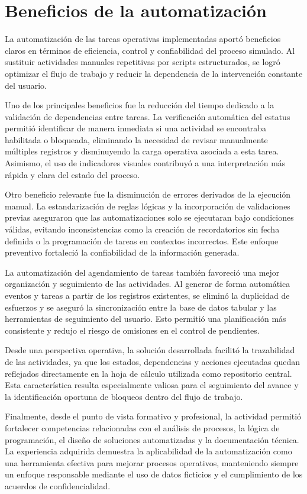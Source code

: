 \documentclass[12pt]{article}
\begin{document}
\section*{Beneficios de la automatización}

La automatización de las tareas operativas implementadas aportó beneficios claros en términos de eficiencia, control y confiabilidad del proceso simulado. Al sustituir actividades manuales repetitivas por scripts estructurados, se logró optimizar el flujo de trabajo y reducir la dependencia de la intervención constante del usuario.

Uno de los principales beneficios fue la reducción del tiempo dedicado a la validación de dependencias entre tareas. La verificación automática del estatus permitió identificar de manera inmediata si una actividad se encontraba habilitada o bloqueada, eliminando la necesidad de revisar manualmente múltiples registros y disminuyendo la carga operativa asociada a esta tarea. Asimismo, el uso de indicadores visuales contribuyó a una interpretación más rápida y clara del estado del proceso.

Otro beneficio relevante fue la disminución de errores derivados de la ejecución manual. La estandarización de reglas lógicas y la incorporación de validaciones previas aseguraron que las automatizaciones solo se ejecutaran bajo condiciones válidas, evitando inconsistencias como la creación de recordatorios sin fecha definida o la programación de tareas en contextos incorrectos. Este enfoque preventivo fortaleció la confiabilidad de la información generada.

La automatización del agendamiento de tareas también favoreció una mejor organización y seguimiento de las actividades. Al generar de forma automática eventos y tareas a partir de los registros existentes, se eliminó la duplicidad de esfuerzos y se aseguró la sincronización entre la base de datos tabular y las herramientas de seguimiento del usuario. Esto permitió una planificación más consistente y redujo el riesgo de omisiones en el control de pendientes.

Desde una perspectiva operativa, la solución desarrollada facilitó la trazabilidad de las actividades, ya que los estados, dependencias y acciones ejecutadas quedan reflejados directamente en la hoja de cálculo utilizada como repositorio central. Esta característica resulta especialmente valiosa para el seguimiento del avance y la identificación oportuna de bloqueos dentro del flujo de trabajo.

Finalmente, desde el punto de vista formativo y profesional, la actividad permitió fortalecer competencias relacionadas con el análisis de procesos, la lógica de programación, el diseño de soluciones automatizadas y la documentación técnica. La experiencia adquirida demuestra la aplicabilidad de la automatización como una herramienta efectiva para mejorar procesos operativos, manteniendo siempre un enfoque responsable mediante el uso de datos ficticios y el cumplimiento de los acuerdos de confidencialidad.
\end{document}

